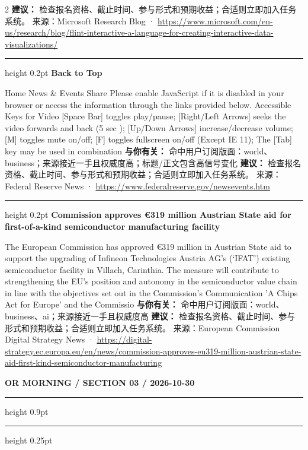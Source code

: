 \documentclass[10.5pt]{ctexart}
\begin{document}
\begin{multicols}{2}
\textbf{建议：} 检查报名资格、截止时间、参与形式和预期收益；合适则立即加入任务系统。
{\footnotesize\color{ormuted} 来源：Microsoft Research Blog · \url{https://www.microsoft.com/en-us/research/blog/flint-interactive-a-language-for-creating-interactive-data-visualizations/}}
\vspace{2mm}
\hrule height 0.2pt
\vspace{2mm}
{\large\bfseries Back to Top}\par
Home News \& Events Share Please enable JavaScript if it is disabled in your browser or access the information through the links provided below. Accessible Keys for Video [Space Bar] toggles play/pause; [Right/Left Arrows] seeks the video forwards and back (5 sec ); [Up/Down Arrows] increase/decrease volume; [M] toggles mute on/off; [F] toggles fullscreen on/off (Except IE 11); The [Tab] key may be used in combination
\textbf{与你有关：} 命中用户订阅版面：world、business；来源接近一手且权威度高；标题/正文包含高信号变化
\textbf{建议：} 检查报名资格、截止时间、参与形式和预期收益；合适则立即加入任务系统。
{\footnotesize\color{ormuted} 来源：Federal Reserve News · \url{https://www.federalreserve.gov/newsevents.htm}}
\vspace{2mm}
\hrule height 0.2pt
\vspace{2mm}
{\large\bfseries Commission approves €319 million Austrian State aid for first-of-a-kind semiconductor manufacturing facility}\par
The European Commission has approved €319 million in Austrian State aid to support the upgrading of Infineon Technologies Austria AG’s (‘IFAT’) existing semiconductor facility in Villach, Carinthia. The measure will contribute to strengthening the EU’s position and autonomy in the semiconductor value chain in line with the objectives set out in the Commission's Communication 'A Chips Act for Europe' and the Commissio
\textbf{与你有关：} 命中用户订阅版面：world、business、ai；来源接近一手且权威度高
\textbf{建议：} 检查报名资格、截止时间、参与形式和预期收益；合适则立即加入任务系统。
{\footnotesize\color{ormuted} 来源：European Commission Digital Strategy News · \url{https://digital-strategy.ec.europa.eu/en/news/commission-approves-eu319-million-austrian-state-aid-first-kind-semiconductor-manufacturing}}
\end{multicols}
\newpage
{\small\bfseries OR MORNING / SECTION 03 / 2026-10-30}
\vspace{2mm}
\hrule height 0.9pt
\vspace{1.5mm}
\hrule height 0.25pt
\vspace{4mm}
\end{document}
